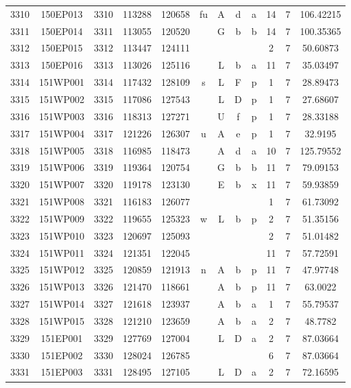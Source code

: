 \begin{tabular}{|*{12}{c|}}
3310 & 150EP013 & 3310 & 113288 & 120658 & fu & A & d & a & 14 & 7 & 106.42215 \\ 
3311 & 150EP014 & 3311 & 113055 & 120520 &  & G & b & b & 14 & 7 & 100.35365 \\ 
3312 & 150EP015 & 3312 & 113447 & 124111 &  &  &  &  & 2 & 7 & 50.60873 \\ 
3313 & 150EP016 & 3313 & 113026 & 125116 &  & L & b & a & 11 & 7 & 35.03497 \\ 
3314 & 151WP001 & 3314 & 117432 & 128109 & s & L & F & p & 1 & 7 & 28.89473 \\ 
3315 & 151WP002 & 3315 & 117086 & 127543 &  & L & D & p & 1 & 7 & 27.68607 \\ 
3316 & 151WP003 & 3316 & 118313 & 127271 &  & U & f & p & 1 & 7 & 28.33188 \\ 
3317 & 151WP004 & 3317 & 121226 & 126307 & u & A & e & p & 1 & 7 & 32.9195 \\ 
3318 & 151WP005 & 3318 & 116985 & 118473 &  & A & d & a & 10 & 7 & 125.79552 \\ 
3319 & 151WP006 & 3319 & 119364 & 120754 &  & G & b & b & 11 & 7 & 79.09153 \\ 
3320 & 151WP007 & 3320 & 119178 & 123130 &  & E & b & x & 11 & 7 & 59.93859 \\ 
3321 & 151WP008 & 3321 & 116183 & 126077 &  &  &  &  & 1 & 7 & 61.73092 \\ 
3322 & 151WP009 & 3322 & 119655 & 125323 & w & L & b & p & 2 & 7 & 51.35156 \\ 
3323 & 151WP010 & 3323 & 120697 & 125093 &  &  &  &  & 2 & 7 & 51.01482 \\ 
3324 & 151WP011 & 3324 & 121351 & 122045 &  &  &  &  & 11 & 7 & 57.72591 \\ 
3325 & 151WP012 & 3325 & 120859 & 121913 & n & A & b & p & 11 & 7 & 47.97748 \\ 
3326 & 151WP013 & 3326 & 121470 & 118661 &  & A & b & p & 11 & 7 & 63.0022 \\ 
3327 & 151WP014 & 3327 & 121618 & 123937 &  & A & b & a & 1 & 7 & 55.79537 \\ 
3328 & 151WP015 & 3328 & 121210 & 123659 &  & A & b & a & 2 & 7 & 48.7782 \\ 
3329 & 151EP001 & 3329 & 127769 & 127004 &  & L & D & a & 2 & 7 & 87.03664 \\ 
3330 & 151EP002 & 3330 & 128024 & 126785 &  &  &  &  & 6 & 7 & 87.03664 \\ 
3331 & 151EP003 & 3331 & 128495 & 127105 &  & L & D & a & 2 & 7 & 72.16595 \\ 

\end{tabular}

